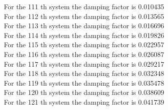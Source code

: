\documentclass[11pt]{article}
\begin{document}
For the 111 th system the damping factor is 0.010435 \\
For the 112 th system the damping factor is 0.013565 \\
For the 113 th system the damping factor is 0.016696 \\
For the 114 th system the damping factor is 0.019826 \\
For the 115 th system the damping factor is 0.022957 \\
For the 116 th system the damping factor is 0.026087 \\
For the 117 th system the damping factor is 0.029217 \\
For the 118 th system the damping factor is 0.032348 \\
For the 119 th system the damping factor is 0.035478 \\
For the 120 th system the damping factor is 0.038609 \\
For the 121 th system the damping factor is 0.041739 \\
\end{document}

